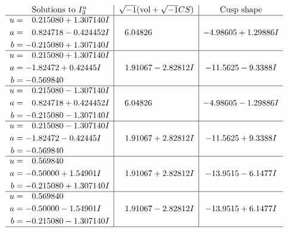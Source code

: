 \documentclass[1p]{elsarticle_modified}
\theoremstyle{definition}
\newcommand{\I}{\sqrt{-1}}
\begin{document}
$$\begin{array}{c|c|c}  
\text{Solutions to }I^u_{3}& \I (\text{vol} + \sqrt{-1}CS) & \text{Cusp shape}\\
 \hline 
\begin{aligned}
u &= \phantom{-}0.215080 + 1.307140 I \\
a &= \phantom{-}0.824718 - 0.424452 I \\
b &= -0.215080 + 1.307140 I\end{aligned}
 & \phantom{-}6.04826\phantom{ +0.000000I} & -4.98605 + 1.29886 I \\ \hline\begin{aligned}
u &= \phantom{-}0.215080 + 1.307140 I \\
a &= -1.82472 + 0.42445 I \\
b &= -0.569840\phantom{ +0.000000I}\end{aligned}
 & \phantom{-}1.91067 - 2.82812 I & -11.5625 - 9.3388 I \\ \hline\begin{aligned}
u &= \phantom{-}0.215080 - 1.307140 I \\
a &= \phantom{-}0.824718 + 0.424452 I \\
b &= -0.215080 - 1.307140 I\end{aligned}
 & \phantom{-}6.04826\phantom{ +0.000000I} & -4.98605 - 1.29886 I \\ \hline\begin{aligned}
u &= \phantom{-}0.215080 - 1.307140 I \\
a &= -1.82472 - 0.42445 I \\
b &= -0.569840\phantom{ +0.000000I}\end{aligned}
 & \phantom{-}1.91067 + 2.82812 I & -11.5625 + 9.3388 I \\ \hline\begin{aligned}
u &= \phantom{-}0.569840\phantom{ +0.000000I} \\
a &= -0.50000 + 1.54901 I \\
b &= -0.215080 + 1.307140 I\end{aligned}
 & \phantom{-}1.91067 + 2.82812 I & -13.9515 - 6.1477 I \\ \hline\begin{aligned}
u &= \phantom{-}0.569840\phantom{ +0.000000I} \\
a &= -0.50000 - 1.54901 I \\
b &= -0.215080 - 1.307140 I\end{aligned}
 & \phantom{-}1.91067 - 2.82812 I & -13.9515 + 6.1477 I\\
 \hline 
 \end{array}$$\newpage
\end{document}
